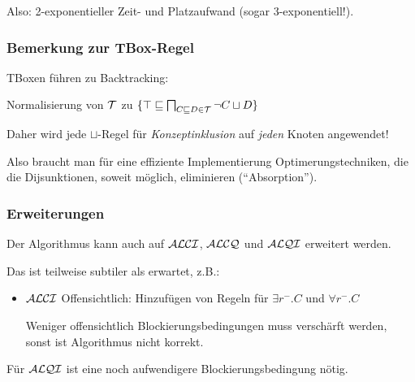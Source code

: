 Also: 2-exponentieller Zeit- und Platzaufwand (sogar 3-exponentiell!).

\subsubsection{Bemerkung zur TBox-Regel}

TBoxen führen zu Backtracking:

\begin{center}Normalisierung von $\mathcal{T}$ zu $\{\top \sqsubseteq \bigsqcap_{C \sqsubseteq D \in \mathcal{T}} \neg C \sqcup D\}$\end{center}

Daher wird jede $\sqcup$-Regel für \emph{Konzeptinklusion} auf \emph{jeden} Knoten angewendet!

Also braucht man für eine effiziente Implementierung Optimerungstechniken, die die Dijsunktionen, soweit möglich, eliminieren (\enquote{Absorption}).

\subsubsection{Erweiterungen}

Der Algorithmus kann auch auf $\mathcal{A}\mathcal{L}\mathcal{C}\mathcal{I}$, $\mathcal{A}\mathcal{L}\mathcal{C}\mathcal{Q}$ und $\mathcal{A}\mathcal{L}\mathcal{Q}\mathcal{I}$ erweitert werden.

Das ist teilweise subtiler als erwartet, z.B.:

\begin{itemize}
	\item $\mathcal{A}\mathcal{L}\mathcal{C}\mathcal{I}$
	Offensichtlich: Hinzufügen von Regeln für $\exists r^{-}.C$ und $\forall r^-.C$

	Weniger offensichtlich Blockierungsbedingungen muss verschärft werden, sonst ist Algorithmus nicht korrekt.
\end{itemize}

Für $\mathcal{A}\mathcal{L}\mathcal{Q}\mathcal{I}$ ist eine noch aufwendigere Blockierungsbedingung nötig.
